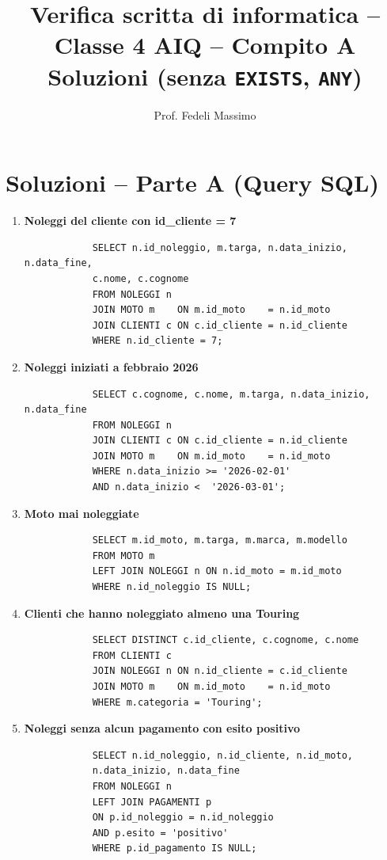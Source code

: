 \documentclass[a4paper,12pt]{article}
\title{Verifica scritta di informatica -- Classe 4 AIQ -- Compito A\\
	Soluzioni (senza \texttt{EXISTS}, \texttt{ANY})}
\author{Prof. Fedeli Massimo}
\date{}
\begin{document}
	\maketitle
	
	\section*{Soluzioni -- Parte A (Query SQL)}
	
	\begin{enumerate}
		
		\item \textbf{Noleggi del cliente con id\_cliente = 7}
		\begin{lstlisting}
			SELECT n.id_noleggio, m.targa, n.data_inizio, n.data_fine,
			c.nome, c.cognome
			FROM NOLEGGI n
			JOIN MOTO m    ON m.id_moto    = n.id_moto
			JOIN CLIENTI c ON c.id_cliente = n.id_cliente
			WHERE n.id_cliente = 7;
		\end{lstlisting}
		
		\item \textbf{Noleggi iniziati a febbraio 2026}
		\begin{lstlisting}
			SELECT c.cognome, c.nome, m.targa, n.data_inizio, n.data_fine
			FROM NOLEGGI n
			JOIN CLIENTI c ON c.id_cliente = n.id_cliente
			JOIN MOTO m    ON m.id_moto    = n.id_moto
			WHERE n.data_inizio >= '2026-02-01'
			AND n.data_inizio <  '2026-03-01';
		\end{lstlisting}
		
		\item \textbf{Moto mai noleggiate}
		\begin{lstlisting}
			SELECT m.id_moto, m.targa, m.marca, m.modello
			FROM MOTO m
			LEFT JOIN NOLEGGI n ON n.id_moto = m.id_moto
			WHERE n.id_noleggio IS NULL;
		\end{lstlisting}
		
		\item \textbf{Clienti che hanno noleggiato almeno una Touring}
		\begin{lstlisting}
			SELECT DISTINCT c.id_cliente, c.cognome, c.nome
			FROM CLIENTI c
			JOIN NOLEGGI n ON n.id_cliente = c.id_cliente
			JOIN MOTO m    ON m.id_moto    = n.id_moto
			WHERE m.categoria = 'Touring';
		\end{lstlisting}
		
		\item \textbf{Noleggi senza alcun pagamento con esito positivo}
		\begin{lstlisting}
			SELECT n.id_noleggio, n.id_cliente, n.id_moto,
			n.data_inizio, n.data_fine
			FROM NOLEGGI n
			LEFT JOIN PAGAMENTI p
			ON p.id_noleggio = n.id_noleggio
			AND p.esito = 'positivo'
			WHERE p.id_pagamento IS NULL;
		\end{lstlisting}
		

\end{enumerate}
\end{document}
